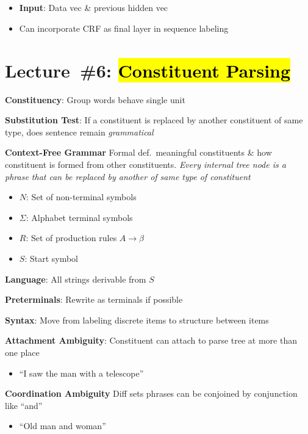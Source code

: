 \documentclass[8pt]{extarticle}
\renewcommand{\green}[1]{{\color{ForestGreen} #1}}
\newcommand{\greenbf}[1]{\textbf{\green{#1}}}
\begin{document}
\begin{multicols}{3}
  \subsection*{}

  \begin{itemize}
    \item \textbf{Input}: Data vec \& previous hidden vec
    \item Can incorporate CRF as final layer in sequence labeling
  \end{itemize}

  \section*{Lecture~\#6: \hl{Constituent Parsing}}

  \greenbf{Constituency}: Group words behave single unit

  \greenbf{Substitution Test}: If a constituent is replaced by another constituent of same type, does sentence remain \textit{grammatical}

  \greenbf{Context-Free Grammar} Formal def.\ meaningful constituents \& how constituent is formed from other constituents.  \textit{Every internal tree node is a phrase that can be replaced by another of same type of constituent}
  \begin{itemize}
    \item $N$: Set of non-terminal symbols
    \item $\Sigma$: Alphabet terminal symbols
    \item $R$: Set of production rules $A \rightarrow \beta$
    \item $S$: Start symbol
  \end{itemize}

  \textbf{Language}: All strings derivable from $S$

  \textbf{Preterminals}: Rewrite as terminals if possible

  \textbf{Syntax}: Move from labeling discrete items to structure between items

  \greenbf{Attachment Ambiguity}: Constituent can attach to parse tree at more than one place
  \begin{itemize}
    \item ``I saw the man with a telescope''
  \end{itemize}

  \greenbf{Coordination Ambiguity} Diff sets phrases can be conjoined by conjunction like ``and''
  \begin{itemize}
    \item ``Old man and woman''
  \end{itemize}


\end{multicols}
\end{document}
